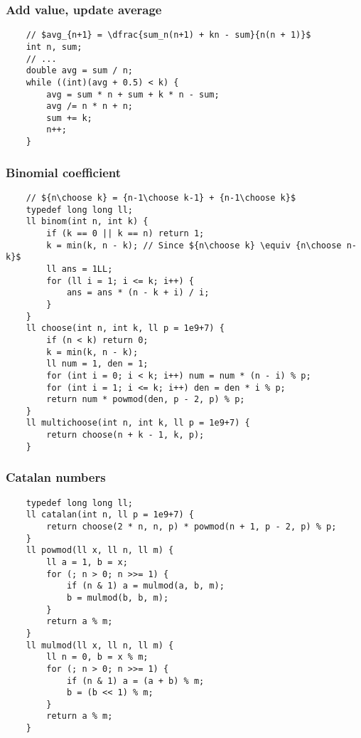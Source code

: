 \documentclass{article}
\begin{document}
\subsubsection{Add value, update average}
\begin{verbatim}
    // $avg_{n+1} = \dfrac{sum_n(n+1) + kn - sum}{n(n + 1)}$
    int n, sum;
    // ...
    double avg = sum / n;
    while ((int)(avg + 0.5) < k) {
        avg = sum * n + sum + k * n - sum;
        avg /= n * n + n;
        sum += k;
        n++;
    }
\end{verbatim}

\subsubsection{Binomial coefficient}
\begin{verbatim}
    // ${n\choose k} = {n-1\choose k-1} + {n-1\choose k}$
    typedef long long ll;
    ll binom(int n, int k) {
        if (k == 0 || k == n) return 1;
        k = min(k, n - k); // Since ${n\choose k} \equiv {n\choose n-k}$
        ll ans = 1LL;
        for (ll i = 1; i <= k; i++) {
            ans = ans * (n - k + i) / i;
        }
    }
    ll choose(int n, int k, ll p = 1e9+7) {
        if (n < k) return 0;
        k = min(k, n - k);
        ll num = 1, den = 1;
        for (int i = 0; i < k; i++) num = num * (n - i) % p;
        for (int i = 1; i <= k; i++) den = den * i % p;
        return num * powmod(den, p - 2, p) % p;
    }
    ll multichoose(int n, int k, ll p = 1e9+7) {
        return choose(n + k - 1, k, p);
    }
\end{verbatim}

\subsubsection{Catalan numbers}
\begin{verbatim}
    typedef long long ll;
    ll catalan(int n, ll p = 1e9+7) {
        return choose(2 * n, n, p) * powmod(n + 1, p - 2, p) % p;
    }
    ll powmod(ll x, ll n, ll m) {
        ll a = 1, b = x;
        for (; n > 0; n >>= 1) {
            if (n & 1) a = mulmod(a, b, m);
            b = mulmod(b, b, m);
        }
        return a % m;
    }
    ll mulmod(ll x, ll n, ll m) {
        ll n = 0, b = x % m;
        for (; n > 0; n >>= 1) {
            if (n & 1) a = (a + b) % m;
            b = (b << 1) % m;
        }
        return a % m;
    }
\end{verbatim}
\end{document}
